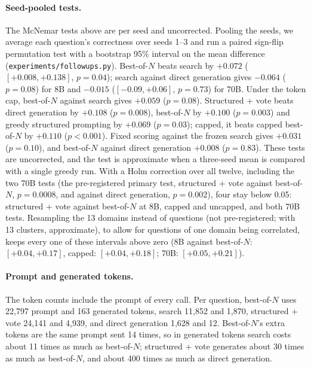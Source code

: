 \paragraph{Seed-pooled tests.} The McNemar tests above are per seed and uncorrected. Pooling the seeds, we average each question's correctness over seeds 1--3 and run a paired sign-flip permutation test with a bootstrap 95\% interval on the mean difference (\texttt{experiments/followups.py}). Best-of-$N$ beats search by $+0.072$ ($[+0.008, +0.138]$, $p = 0.04$); search against direct generation gives $-0.064$ ($p = 0.08$) for 8B and $-0.015$ ($[-0.09, +0.06]$, $p = 0.73$) for 70B. Under the token cap, best-of-$N$ against search gives $+0.059$ ($p = 0.08$). Structured + vote beats direct generation by $+0.108$ ($p = 0.008$), best-of-$N$ by $+0.100$ ($p = 0.003$) and greedy structured prompting by $+0.069$ ($p = 0.03$); capped, it beats capped best-of-$N$ by $+0.110$ ($p < 0.001$). Fixed scoring against the frozen search gives $+0.031$ ($p = 0.10$), and best-of-$N$ against direct generation $+0.008$ ($p = 0.83$). These tests are uncorrected, and the test is approximate when a three-seed mean is compared with a single greedy run. With a Holm correction over all twelve, including the two 70B tests (the pre-registered primary test, structured + vote against best-of-$N$, $p = 0.0008$, and against direct generation, $p = 0.002$), four stay below 0.05: structured + vote against best-of-$N$ at 8B, capped and uncapped, and both 70B tests. Resampling the 13 domains instead of questions (not pre-registered; with 13 clusters, approximate), to allow for questions of one domain being correlated, keeps every one of these intervals above zero (8B against best-of-$N$: $[+0.04, +0.17]$, capped: $[+0.04, +0.18]$; 70B: $[+0.05, +0.21]$).

\paragraph{Prompt and generated tokens.} The token counts include the prompt of every call. Per question, best-of-$N$ uses 22,797 prompt and 163 generated tokens, search 11,852 and 1,870, structured + vote 24,141 and 4,939, and direct generation 1,628 and 12. Best-of-$N$'s extra tokens are the same prompt sent 14 times, so in generated tokens search costs about 11 times as much as best-of-$N$; structured + vote generates about 30 times as much as best-of-$N$, and about 400 times as much as direct generation.
